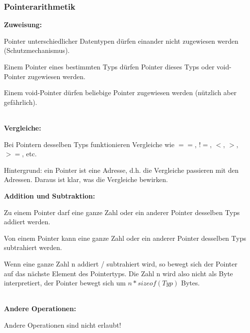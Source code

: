 	\subsubsection{Pointerarithmetik }
		\begin{minipage}[t]{9 cm}
			\textbf{Zuweisung:} 
			\begin{compactitem}
				\item Pointer unterschiedlicher Datentypen dürfen einander nicht zugewiesen werden (Schutzmechanismus).
				\item Einem Pointer eines bestimmten Typs dürfen Pointer dieses Typs oder void-Pointer zugewiesen werden.
				\item Einem void-Pointer dürfen beliebige Pointer zugewiesen werden (nützlich aber gefährlich).
			\end{compactitem}
			\ \\
			\textbf{Vergleiche:} 
			\begin{compactitem}
				\item Bei Pointern desselben Typs funktionieren Vergleiche wie $==$, $!=$, $<$, $>$, $>=$, etc.
				\item Hintergrund: ein Pointer ist eine Adresse, d.h. die Vergleiche passieren mit den Adressen. Daraus ist klar, was die Vergleiche bewirken.
			\end{compactitem}
		\end{minipage}	
		\hspace*{0.5cm}
		\begin{minipage}[t]{9 cm}
			\textbf{Addition und Subtraktion:} 
				\begin{compactitem}
					\item Zu einem Pointer darf eine ganze Zahl oder ein anderer Pointer desselben Typs addiert werden.
					\item Von einem Pointer kann eine ganze Zahl oder ein anderer Pointer desselben	Typs subtrahiert werden.
					\item Wenn eine ganze Zahl n addiert / subtrahiert wird, so bewegt sich der Pointer	auf das nächste Element des Pointertyps. Die Zahl n wird also nicht als Byte interpretiert, der Pointer bewegt sich um $n*sizeof(Typ)$ Bytes.
				\end{compactitem}
				\ \\
				\textbf{Andere Operationen:} 
				\begin{compactitem}
					\item Andere Operationen sind nicht erlaubt!
				\end{compactitem}
		\end{minipage}	

